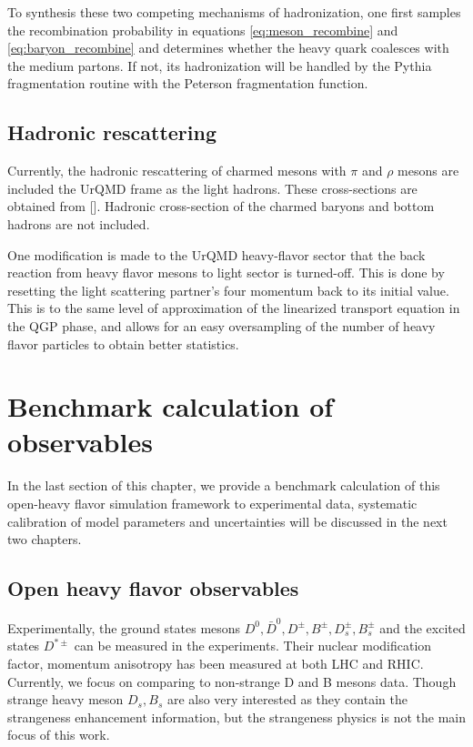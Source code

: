 To synthesis these two competing mechanisms of hadronization, one first samples the recombination probability in equations \ref{eq:meson_recombine} and \ref{eq:baryon_recombine} and determines whether the heavy quark coalesces with the medium partons. 
If not, its hadronization will be handled by the Pythia fragmentation routine with the Peterson fragmentation function.

\subsection{Hadronic rescattering}
Currently, the hadronic rescattering of charmed mesons with $\pi$ and $\rho$ mesons are included the UrQMD frame as the light hadrons. 
These cross-sections are obtained from [].
Hadronic cross-section of the charmed baryons and bottom hadrons are not included.

One modification is made to the UrQMD heavy-flavor sector that the back reaction from heavy flavor mesons to light sector is turned-off. 
This is done by resetting the light scattering partner's four momentum back to its initial value.
This is to the same level of approximation of the linearized transport equation in the QGP phase, and allows for an easy oversampling of the number of heavy flavor particles to obtain better statistics.

\section{Benchmark calculation of observables}
\label{section:benchmark}
In the last section of this chapter, we provide a benchmark calculation of this open-heavy flavor simulation framework to experimental data, systematic calibration of model parameters and uncertainties will be discussed in the next two chapters.

\subsection{Open heavy flavor observables}
Experimentally, the ground states mesons $D^0, \bar{D}^0, D^{\pm}, B^{\pm}, D_s^{\pm}, B_s^{\pm}$ and the excited states $D^{*\pm}$ can be measured in the experiments. 
Their nuclear modification factor, momentum anisotropy has been measured at both LHC and RHIC.
Currently, we focus on comparing to non-strange D and B mesons data.
Though strange heavy meson $D_s, B_s$ are also very interested as they contain the strangeness enhancement information, but the strangeness physics is not the main focus of this work.

